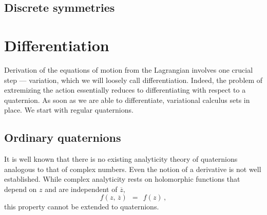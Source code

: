 \documentclass[epsfig,12pt]{article}
\newcommand{\ov}{\overline}
\begin{document}
\subsection{Discrete symmetries}




\section{Differentiation}
\label{section-diff}

	Derivation of the equations of motion from the Lagrangian involves one
	crucial step --- variation, which we will loosely call differentiation.
	Indeed, the problem of extremizing the action essentially reduces
	to differentiating with respect to a quaternion.
	As soon as we are able to differentiate, variational calculus sets in place.
	We start with regular quaternions.


\subsection{Ordinary quaternions}
\label{sec-ordinary-quat}

	It is well known that there is no existing analyticity theory of quaternions
	analogous to that of complex numbers.
	Even the notion of a derivative is not well established.
	While complex analyticity rests on holomorphic functions that depend on $ z $ and
	are independent of $ \ov z $,
\[
	f(z,\, \ov z)	~~=~~	f(z)\,,
\]
	this property cannot be extended to quaternions.
\end{document}
